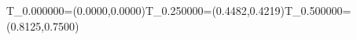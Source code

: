 T_{0.000000}=(0.0000,0.0000)\quad T_{0.250000}=(0.4482,0.4219)\quad T_{0.500000}=(0.8125,0.7500)\quad 